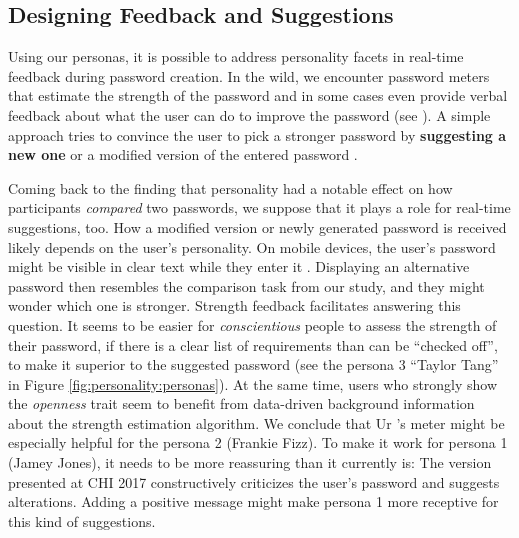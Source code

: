 \subsection{Designing Feedback and Suggestions}
Using our personas, it is possible to address personality facets in real-time feedback during password creation. In the wild, we encounter password meters that estimate the strength of the password and in some cases even provide verbal feedback about what the user can do to improve the password (see  \cite{Carnavalet2014AnalyzingPWStrengthMeters,Wheeler2016zxcvbn}). A simple approach tries to convince the user to pick a stronger password by \textbf{suggesting a new one} or a modified version of the entered password \cite{Forget2008ImprovingPasswordsThroughPersuasion, Seitz2016SuggestionsDecoy, Shay2015SpoonfulOfSugar, Ur2017DataDrivenPWMeter}. 

Coming back to the finding that personality had a notable effect on how participants \textit{compared} two passwords, we suppose that it plays a role for real-time suggestions, too. How a modified version or newly generated password is received likely depends on the user's personality. On mobile devices, the user's password might be visible in clear text while they enter it \cite{Melicher2016UsabilityMobileTextPasswords}. Displaying an alternative password then resembles the comparison task from our study, and they might wonder which one is stronger. Strength feedback facilitates answering this question. It seems to be easier for \textit{conscientious} people to assess the strength of their password, if there is a clear list of requirements than can be ``checked off'', to make it superior to the suggested password (see the persona 3 ``Taylor Tang'' in Figure \ref{fig:personality:personas}). At the same time, users who strongly show the \textit{openness} trait seem to benefit from data-driven background information about the strength estimation algorithm. We conclude that Ur \etal's meter might be especially helpful for the persona 2 (Frankie Fizz). To make it work for persona 1 (Jamey Jones), it needs to be more reassuring than it currently is: The version presented at CHI 2017 constructively criticizes the user's password and suggests alterations. Adding a positive message might make persona 1 more receptive for this kind of suggestions. 

